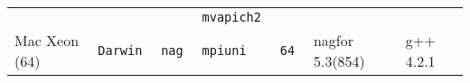 \begin{longtable}{lllllll}
                      &           &                 &\tt mvapich2   &                    &                                    &                                 \\
Mac Xeon (64)         &\tt Darwin &\tt nag          &\tt mpiuni     &\tt 64              & nagfor \footnotesize 5.3(854)       & g++ \footnotesize 4.2.1         \\ %

\end{longtable}

